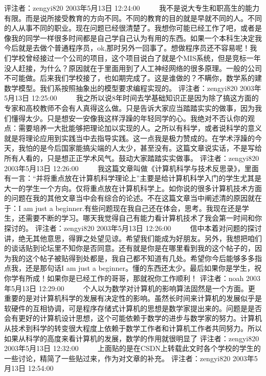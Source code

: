 评注者：zengyi820	2003年5月13日 12:24:00
　　 我不是说大专生和职高生的能力有限。而是说所接受教育的方向不同。不同的教育的目的就是早就不同的人。不同的人从事不同的职业。现在问题已经很清楚了。我想你可能已经工作了吧，或者是像我的同学一样很多时间都是自己学自己认为有用的东西。如果一个本科生决定我今后就是去做个普通程序员，ok,那时另外一回事了。想做程序员还不容易呢！我们学校曾经接过一个公司的项目，这个项目说白了就是个MIS系统，但是竞标一年没人赶接，为什么？原因就在于里面用到了人工神经网络的很多原理。一般的公司不可能做。后来我们学校接了，也如期完成了。这是谁做的？不瞒你，数学系的建数学模型。我们系按照抽象出的模型要求编程实现的。
评注者：zengyi820	2003年5月13日 12:25:00
　　 我之所以说8年时间去学基础知识正是因为除了搞这方面的专家和高校教师不会有人真得这么做。只是告诉大家应当踏踏实实的做事，因为我们懂得太少。只是想安一安像我这样浮躁的年轻同学的心。我绝对不否认你的观点：需要培养一大批能够把理论加以实现的人。之所以有科学，或者说科学的意义就是将理论应用到实践当中去指导实践。这一点我是极力赞成的。在学术浮躁的今天，我怕的是今后国家能搞尖端的人太少，甚至没有。这篇文章说实话，不是写给所有人看的，只是想正正学术风气。鼓动大家踏踏实实做事。
评注者：zengyi820	2003年5月13日 12:26:00
　　 我这篇文章叫做《计算机科学与技术反思录》，里面有一言：“并将重点放在计算机科学理论上”主要是给计算机科学入门的学生尤其是大一的学生一个方向。仅将重点放在计算机科学上。如你说的很多计算机技术方面的问题在我的其他文章当中会有综合的论述。不在这篇文章当中阐述清的原因就在于：I am just a beginner.有些问题现在我自己还在体会，思考。我现在还是学生，还需要不断的学习。哪天我觉得自己有能力看计算机技术了我会第一时间和你探讨的。
评注者：zengyi820	2003年5月13日 12:26:00
　　 信中本着对问题的探讨讲，绝无其他意思，得罪之处望见谅。希望我们能成为好朋友。另外，我想把咱们的谈话贴到论坛里不知你是否同意。还有就是你是在哪里看到我的这个帖子的，因为我的这个帖子被贴得到处都是，我自己都不知道有几处。希望你今后能够多多指点我，还是那句话I am just a beginner。懂的东西还太少。最后如果你是学生，祝你学有所成！如果你是已经工作的哥哥，那就祝你工作顺利！
评注者：noah	2003年5月13日 12:29:00
　　 个人以为数学对计算机的影响算法固然是一个方面。更重要的是对计算机科学的发展有决定性的影响。虽然长时间来计算机的发展似乎是软硬件的互相协调，可是程序存储式计算机的思想是数学家提出来的。问题是是否会有更好的计算机设计思想，这个可能依赖于数学的进步与数学家的努力。计算机从技术到科学的转变很大程度上依赖于数学工作者和计算机工作者共同努力。所以如果从科学的高度来看计算机的发展，数学的作用就很明显了
评注者：zengyi820	2003年5月13日 12:32:00
　　 上面贴的是在CSDN上转载此文时各个学校的学生的一些讨论，精简了一些贴过来，作为对文章的补充。
评注者：zengyi820	2003年5月13日 12:54:00

